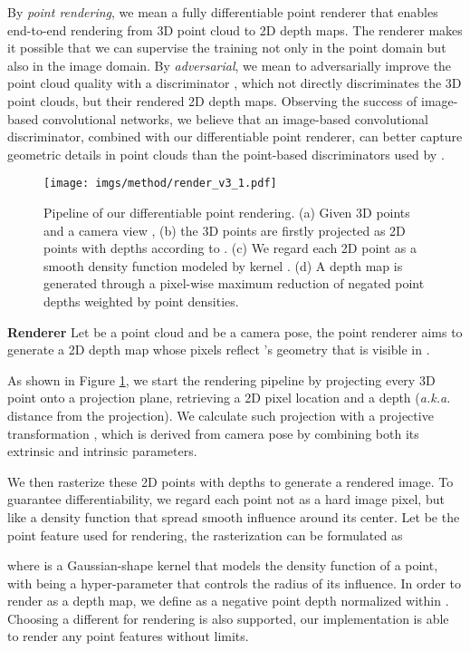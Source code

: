 \documentclass[final]{cvpr}
\begin{document}
By \emph{point rendering}, we mean a fully differentiable point renderer that enables end-to-end rendering from 3D point cloud to 2D depth maps. The renderer makes it possible that we can supervise the training not only in the point domain but also in the image domain. By \emph{adversarial}, we mean to adversarially improve the point cloud quality with a discriminator , which not directly discriminates the 3D point clouds, but their rendered 2D depth maps. Observing the success of image-based convolutional networks, we believe that an image-based convolutional discriminator, combined with our differentiable point renderer, can better capture geometric details in point clouds than the point-based discriminators used by \cite{cascaded_2020_CVPR,chen2019unpaired}. 

\begin{figure}[t]
\centering
\texttt{[image: imgs/method/render\_v3\_1.pdf]}
 \footnotesize
    \caption{Pipeline of our differentiable point rendering. (a) Given 3D points  and a camera view , (b) the 3D points  are firstly projected as 2D points  with depths according to . (c) We regard each 2D point as a smooth density function modeled by kernel . (d) A depth map  is generated through a pixel-wise maximum reduction of negated point depths  weighted by point densities.}
\label{fig:render}
\vspace{-1em}
\end{figure}


\noindent\textbf{Renderer}
Let  be a point cloud and  be a camera pose,
the point renderer aims to generate a 2D depth map  whose pixels reflect 's geometry that is visible in .

As shown in Figure \ref{fig:render}, we start the rendering pipeline by projecting every 3D point  onto a projection plane, retrieving a 2D pixel location  and a depth  (\emph{a.k.a.} distance from the projection). We calculate such projection with a projective transformation , which is derived from camera pose  by combining both its extrinsic and intrinsic parameters. 

We then rasterize these 2D points  with depths  to generate a rendered image.
To guarantee differentiability, we regard each point not as a hard image pixel, but like a density function that spread smooth influence around its center. Let  be the point feature used for rendering, the rasterization can be formulated as
\vspace{-0.5em}

where  is a Gaussian-shape kernel that models the density function of a point, with  being a hyper-parameter that controls the radius of its influence.
In order to render  as a depth map, we define  as a negative point depth normalized within . Choosing a different  for rendering is also supported, our implementation is able to render any point features without limits.
\end{document}
